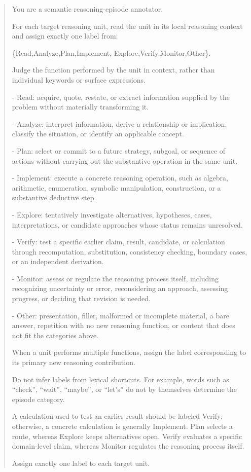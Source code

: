 \begin{quote}
\footnotesize\ttfamily\raggedright
You are a semantic reasoning-episode annotator.\par
For each target reasoning unit, read the unit in its local reasoning context
and assign exactly one label from:\par
\{Read,Analyze,Plan,Implement,
Explore,Verify,Monitor,Other\}.\par
Judge the function performed by the unit in context, rather than
individual keywords or surface expressions.\par
- Read: acquire, quote, restate, or extract information
    supplied by the problem without materially transforming it.\par
- Analyze: interpret information, derive a relationship or
    implication, classify the situation, or identify an applicable concept.\par
- Plan: select or commit to a future strategy, subgoal, or
    sequence of actions without carrying out the substantive operation in the
    same unit.\par
- Implement: execute a concrete reasoning operation, such as
    algebra, arithmetic, enumeration, symbolic manipulation, construction, or
    a substantive deductive step.\par
- Explore: tentatively investigate alternatives, hypotheses,
    cases, interpretations, or candidate approaches whose status remains
    unresolved.\par
- Verify: test a specific earlier claim, result, candidate, or
    calculation through recomputation, substitution, consistency checking,
    boundary cases, or an independent derivation.\par
- Monitor: assess or regulate the reasoning process itself,
    including recognizing uncertainty or error, reconsidering an approach,
    assessing progress, or deciding that revision is needed.\par
- Other: presentation, filler, malformed or incomplete
    material, a bare answer, repetition with no new reasoning function, or
    content that does not fit the categories above.\par
When a unit performs multiple functions, assign the label corresponding to its
primary new reasoning contribution.\par
Do not infer labels from lexical shortcuts. For example, words such as
``check'', ``wait'', ``maybe'', or ``let's'' do not by themselves determine the
episode category.\par
A calculation used to test an earlier result should be labeled
Verify; otherwise, a concrete calculation is generally
Implement. Plan selects a route, whereas
Explore keeps alternatives open. Verify evaluates a
specific domain-level claim, whereas Monitor regulates the reasoning
process itself.\par
Assign exactly one label to each target unit.\par
\end{quote}




